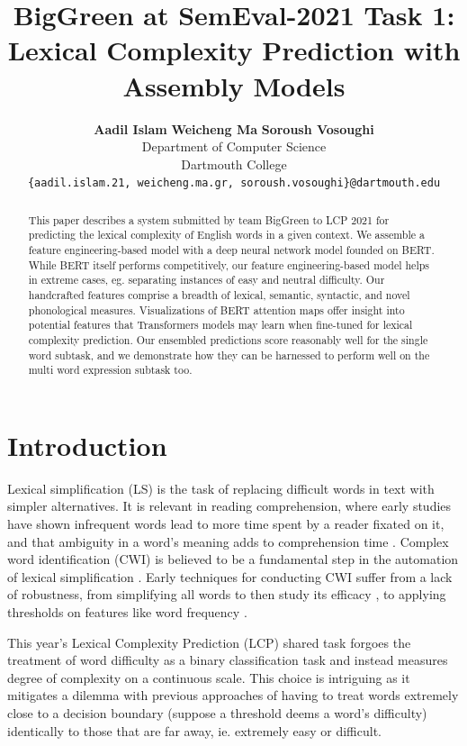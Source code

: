 \documentclass[11pt,a4paper]{article}
\title{BigGreen at SemEval-2021 Task 1: \\
Lexical Complexity Prediction with Assembly Models}
\author{
  \textbf{Aadil Islam}\normalfont{,} \textbf{Weicheng Ma}\normalfont{,} \textbf{Soroush Vosoughi}\\
  Department of Computer Science\\
  Dartmouth College\\
  \texttt{\{aadil.islam.21, weicheng.ma.gr, soroush.vosoughi\}@dartmouth.edu}
}
\date{}
\begin{document}
\maketitle

\begin{abstract}
  This paper describes a system submitted by team BigGreen to LCP 2021 for predicting the lexical complexity of English words in a given context. We assemble a feature engineering-based model with a deep neural network model founded on BERT. While BERT itself performs competitively, our feature engineering-based model helps in extreme cases, eg. separating instances of easy and neutral difficulty. Our handcrafted features comprise a breadth of lexical, semantic, syntactic, and novel phonological measures. Visualizations of BERT attention maps offer insight into potential features that Transformers models may learn when fine-tuned for lexical complexity prediction. Our ensembled predictions score reasonably well for the single word subtask, and we demonstrate how they can be harnessed to perform well on the multi word expression subtask too.
\end{abstract}

\section{Introduction}

Lexical simplification (LS) is the task of replacing difficult words in text with simpler alternatives. It is relevant in reading comprehension, where early studies have shown infrequent words lead to more time spent by a reader fixated on it, and that ambiguity in a word's meaning adds to comprehension time \citep{rayner1986lexical}. Complex word identification (CWI) is believed to be a fundamental step in the automation of lexical simplification \citep{shardlow2014out}. Early techniques for conducting CWI suffer from a lack of robustness, from simplifying all words to then study its efficacy \citep{devlin1998use}, to applying thresholds on features like word frequency \citep{zeng2005text}. 

This year's Lexical Complexity Prediction (LCP) shared task \citep{shardlow2021semeval} forgoes the treatment of word difficulty as a binary classification task \citep{paetzold2016semeval, yimam2018report} and instead measures degree of complexity on a continuous scale. This choice is intriguing as it mitigates a dilemma with previous approaches of having to treat words extremely close to a decision boundary (suppose a threshold deems a word's difficulty) identically to those that are far away, ie. extremely easy or difficult.
\end{document}
